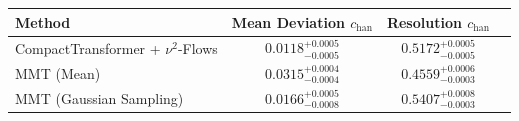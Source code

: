     \begin{tabular}{lccc}
        \toprule
        Method & Mean Deviation $c_{\text{han}}$ & Resolution $c_{\text{han}}$ \\
        \midrule
        CompactTransformer + $\nu^2$-Flows & $0.0118^{+0.0005}_{-0.0005}$ & $0.5172^{+0.0005}_{-0.0005}$ \\
        MMT (Mean) & $0.0315^{+0.0004}_{-0.0004}$ & $0.4559^{+0.0006}_{-0.0003}$ \\
        MMT (Gaussian Sampling) & $0.0166^{+0.0005}_{-0.0008}$ & $0.5407^{+0.0008}_{-0.0003}$ \\
        \bottomrule
    \end{tabular}